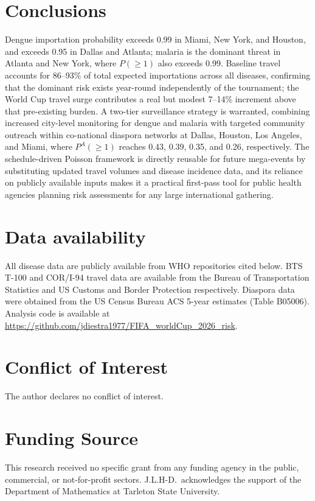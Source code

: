 \documentclass[12pt, a4paper]{article}
\begin{document}
\section{Conclusions}

Dengue importation probability exceeds 0.99 in Miami, New York, and Houston, and exceeds 0.95 in Dallas and Atlanta; malaria is the dominant threat in Atlanta and New York, where $P(\geq 1)$ also exceeds 0.99. Baseline travel accounts for 86--93\% of total expected importations across all diseases, confirming that the dominant risk exists year-round independently of the tournament; the World Cup travel surge contributes a real but modest 7--14\% increment above that pre-existing burden. A two-tier surveillance strategy is warranted, combining increased city-level monitoring for dengue and malaria with targeted community outreach within co-national diaspora networks at Dallas, Houston, Los Angeles, and Miami, where $P^A(\geq 1)$ reaches 0.43, 0.39, 0.35, and 0.26, respectively. The schedule-driven Poisson framework is directly reusable for future mega-events by substituting updated travel volumes and disease incidence data, and its reliance on publicly available inputs makes it a practical first-pass tool for public health agencies planning risk assessments for any large international gathering.

\section*{Data availability}
All disease data are publicly available from WHO repositories cited
below. BTS T-100 and COR/I-94 travel data are available from the
Bureau of Transportation Statistics and US Customs and Border
Protection respectively. Diaspora data were obtained from the
US Census Bureau ACS 5-year estimates (Table B05006).
Analysis code is available at \url{https://github.com/jdiestra1977/FIFA\_worldCup\_2026\_risk}.

\section*{Conflict of Interest}
The author declares no conflict of interest.

\section*{Funding Source}
This research received no specific grant from any funding agency in the public, commercial, or not-for-profit sectors. J.L.H-D.\ acknowledges the support of the Department of Mathematics at Tarleton State University.
\end{document}
